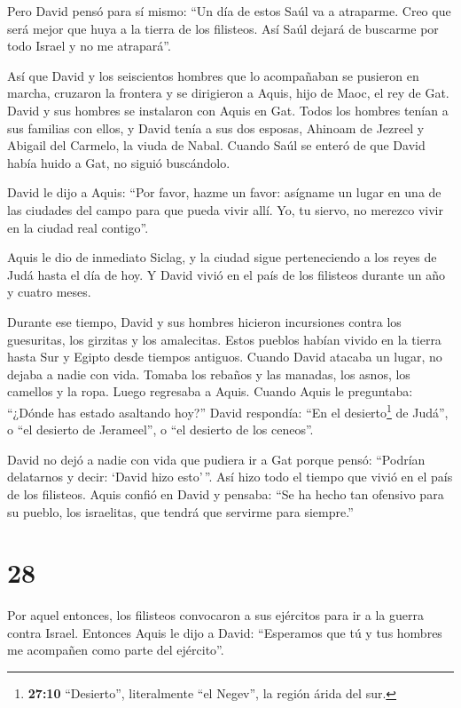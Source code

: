  Pero David pensó para sí mismo: ``Un día de estos Saúl va a
atraparme. Creo que será mejor que huya a la tierra de los filisteos.
Así Saúl dejará de buscarme por todo Israel y no me atrapará''.

 Así que David y los seiscientos hombres que lo acompañaban
se pusieron en marcha, cruzaron la frontera y se dirigieron a Aquis,
hijo de Maoc, el rey de Gat.  David y sus hombres se
instalaron con Aquis en Gat. Todos los hombres tenían a sus familias con
ellos, y David tenía a sus dos esposas, Ahinoam de Jezreel y Abigail del
Carmelo, la viuda de Nabal.  Cuando Saúl se enteró de que
David había huido a Gat, no siguió buscándolo.

 David le dijo a Aquis: ``Por favor, hazme un favor:
asígname un lugar en una de las ciudades del campo para que pueda vivir
allí. Yo, tu siervo, no merezco vivir en la ciudad real contigo''.

 Aquis le dio de inmediato Siclag, y la ciudad sigue
perteneciendo a los reyes de Judá hasta el día de hoy.  Y
David vivió en el país de los filisteos durante un año y cuatro meses.

 Durante ese tiempo, David y sus hombres hicieron
incursiones contra los guesuritas, los girzitas y los amalecitas. Estos
pueblos habían vivido en la tierra hasta Sur y Egipto desde tiempos
antiguos.  Cuando David atacaba un lugar, no dejaba a nadie
con vida. Tomaba los rebaños y las manadas, los asnos, los camellos y la
ropa. Luego regresaba a Aquis.  Cuando Aquis le preguntaba:
``¿Dónde has estado asaltando hoy?'' David respondía: ``En el
desierto\footnote{\textbf{27:10} ``Desierto'', literalmente ``el
  Negev'', la región árida del sur.} de Judá'', o ``el desierto de
Jerameel'', o ``el desierto de los ceneos''.

 David no dejó a nadie con vida que pudiera ir a Gat porque
pensó: ``Podrían delatarnos y decir: `David hizo esto'\,''. Así hizo
todo el tiempo que vivió en el país de los filisteos. 
Aquis confió en David y pensaba: ``Se ha hecho tan ofensivo para su
pueblo, los israelitas, que tendrá que servirme para siempre.''

\hypertarget{section-27}{%
\section{28}\label{section-27}}

 Por aquel entonces, los filisteos convocaron a sus
ejércitos para ir a la guerra contra Israel. Entonces Aquis le dijo a
David: ``Esperamos que tú y tus hombres me acompañen como parte del
ejército''.

